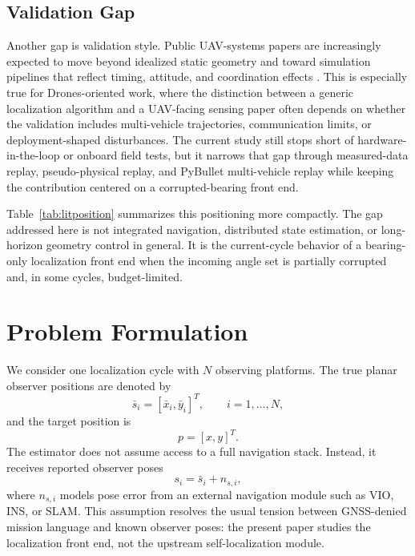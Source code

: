 \documentclass[drones,article,submit,pdftex,moreauthors]{Definitions/mdpi}
\begin{document}
\subsection{Validation Gap}

Another gap is validation style. Public UAV-systems papers are increasingly expected to move beyond idealized static geometry and toward simulation pipelines that reflect timing, attitude, and coordination effects \cite{panerati2021learning,perezsegui2023bridging}. This is especially true for Drones-oriented work, where the distinction between a generic localization algorithm and a UAV-facing sensing paper often depends on whether the validation includes multi-vehicle trajectories, communication limits, or deployment-shaped disturbances. The current study still stops short of hardware-in-the-loop or onboard field tests, but it narrows that gap through measured-data replay, pseudo-physical replay, and PyBullet multi-vehicle replay while keeping the contribution centered on a corrupted-bearing front end.

Table~\ref{tab:litposition} summarizes this positioning more compactly. The gap addressed here is not integrated navigation, distributed state estimation, or long-horizon geometry control in general. It is the current-cycle behavior of a bearing-only localization front end when the incoming angle set is partially corrupted and, in some cycles, budget-limited.



\section{Problem Formulation}

We consider one localization cycle with $N$ observing platforms. The true planar observer positions are denoted by
\begin{equation}
\bar{s}_i = [\bar{x}_i,\bar{y}_i]^T,\qquad i=1,\dots,N,
\end{equation}
and the target position is
\begin{equation}
p = [x,y]^T.
\end{equation}
The estimator does not assume access to a full navigation stack. Instead, it receives reported observer poses
\begin{equation}
s_i = \bar{s}_i + n_{s,i},
\end{equation}
where $n_{s,i}$ models pose error from an external navigation module such as VIO, INS, or SLAM. This assumption resolves the usual tension between GNSS-denied mission language and known observer poses: the present paper studies the localization front end, not the upstream self-localization module.
\end{document}
